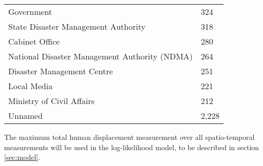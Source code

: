 \documentclass[10pt,a4paper]{article}
\begin{document}
\begin{multicols}{1}
\begin{table}[H]
\begin{centering}
\begin{tabular}{|l|l|}
    Government                                                              & 324       \\
    State Disaster Management Authority                                     & 318       \\
    Cabinet Office                                                          & 280       \\
    National Disaster Management Authority (NDMA)                           & 264       \\
    Disaster Management Centre                                              & 251       \\
    Local Media                                                             & 221       \\
    Ministry of Civil Affairs                                               & 212       \\
    Unnamed                                                                   & 2,228      \\
    \hline
  \end{tabular}
  \end{centering}
\end{table}
The maximum total human displacement measurement over all spatio-temporal measurements will be used in the log-likelihood model, to be described in section \ref{sec:model}.

\end{multicols}
\end{document}
